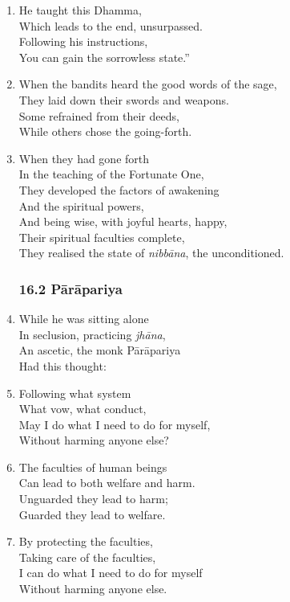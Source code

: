 \documentclass[10pt, openany]{book}
\newcommand*{\vleftofline}[1]{\leavevmode\llap{#1}}
\begin{document}
\begin{enumerate}
\item He taught this Dhamma,\\
Which leads to the end, unsurpassed.\\
Following his instructions,\\
You can gain the sorrowless state.”

\item When the bandits heard the good words of the sage,\\
They laid down their swords and weapons.\\
Some refrained from their deeds,\\
While others chose the going-forth.

\item When they had gone forth \\
In the teaching of the Fortunate One,\\
They developed the factors of awakening \\
And the spiritual powers,\\
And being wise, with joyful hearts, happy, \\
Their spiritual faculties complete,\\
They realised the state of \emph{nibbāna}, the unconditioned.

\subsubsection*{16.2 Pārāpariya}

\item While he was sitting alone\\
In seclusion, practicing \emph{jhāna},\\
An ascetic, the monk Pārāpariya\\
Had this thought:

\item \vleftofline{“}Following what system\\
What vow, what conduct,\\
May I do what I need to do for myself,\\
Without harming anyone else?

\item The faculties of human beings\\
Can lead to both welfare and harm.\\
Unguarded they lead to harm;\\
Guarded they lead to welfare.

\item By protecting the faculties,\\
Taking care of the faculties,\\
I can do what I need to do for myself\\
Without harming anyone else.


\end{enumerate}
\end{document}
